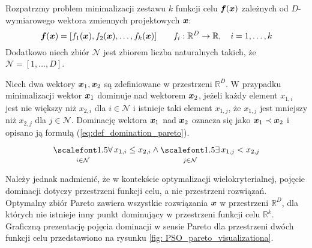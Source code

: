Rozpatrzmy problem minimalizacji zestawu $k$ funkcji celu $\bm{f}(\bm{x})$ zależnych od $D$-wymiarowego wektora zmiennych projektowych $\bm{x}$:
\begin{equation}
	\bm{f}(\bm{x})=[f_1(\bm{x}),f_2(\bm{x}),\dots,f_k(\bm{x})] \qquad f_i:\mathbb{R}^D\rightarrow \mathbb{R},\quad i=1,\dots,k
\end{equation}
Dodatkowo niech zbiór $\mathcal{N}$ jest zbiorem liczba naturalnych takich, że $\mathcal{N}=[1,\dots,D]$.
\begin{definition}
Niech dwa wektory $\bm{x}_1, \bm{x}_2$ są zdefiniowane w przestrzeni $\mathbb{R}^D$. W przypadku minimalizacji wektor $\bm{x}_1$ dominuje nad wektorem $\bm{x}_2$, jeżeli każdy element $x_{1,i}$ jest nie większy niż $x_{2,i}$ dla $i\in \mathcal{N}$ i istnieje taki element $x_{1,j}$, że $x_{1,j}$ jest mniejszy niż $x_{2,j}$ dla $j\in\mathcal{N}$. Dominację wektora $\bm{x}_1$ nad $\bm{x}_2$ oznacza się jako $\bm{x}_1\prec\bm{x}_2$ i opisano ją formułą (\ref{eq:def_domination_pareto}).
\begin{equation} \label{eq:def_domination_pareto}
	\bigforall_{i\in\mathcal{N}} x_{1,i}\le x_{2,i} \land \bigexists_{j\in\mathcal{N}} x_{1,j}<x_{2,j}
\end{equation}
\end{definition}


Należy jednak nadmienić, że w kontekście optymalizacji wielokryterialnej, pojęcie dominacji dotyczy przestrzeni funkcji celu, a nie przestrzeni rozwiązań. Optymalny zbiór Pareto zawiera wszystkie rozwiązania $\bm{x}$ w przestrzeni $\mathbb{R}^D$, dla których nie istnieje inny punkt dominujący w przestrzeni funkcji celu $\mathbb{R}^k$. Graficzną prezentację pojęcia dominacji w sensie Pareto dla przestrzeni dwóch funkcji celu przedstawiono na rysunku \ref{fig: PSO_pareto_visualizationa}.

